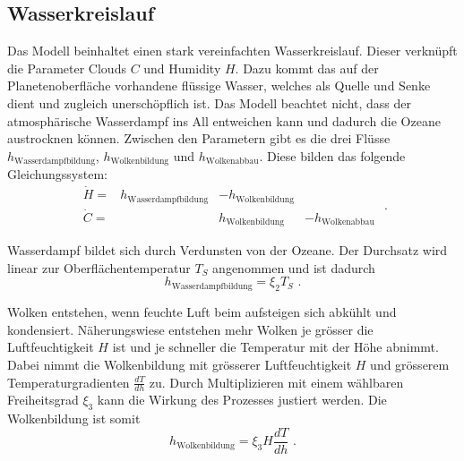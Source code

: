 \begin{refsection}
\subsection{Wasserkreislauf}
Das Modell beinhaltet einen stark vereinfachten Wasserkreislauf.
Dieser verknüpft die Parameter Clouds $C$ und Humidity $H$.
Dazu kommt das auf der Planetenoberfläche vorhandene flüssige Wasser, welches als Quelle und Senke dient und zugleich unerschöpflich ist. Das Modell beachtet nicht, dass der atmosphärische Wasserdampf ins All entweichen kann und dadurch die Ozeane austrocknen können. Zwischen den Parametern gibt es die drei Flüsse $h_{\text{Wasserdampfbildung}}$, $h_{\text{Wolkenbildung}}$ und $h_{\text{Wolkenabbau}}$. Diese bilden das folgende Gleichungssystem: 
\begin{equation}
\begin{matrix}
\dot{H}   = & h_{\text{Wasserdampfbildung}} & - h_{\text{Wolkenbildung}}   &                      \\
\dot{C}   = &                     		    &   h_{\text{Wolkenbildung}}   & - h_{\text{Wolkenabbau}}
\end{matrix} \text{ .}
\end{equation}

Wasserdampf bildet sich durch Verdunsten von der Ozeane. Der Durchsatz wird linear zur Oberflächentemperatur $T_S$ angenommen und ist dadurch
\begin{equation}
h_{\text{Wasserdampfbildung}} = \xi_2 T_S \text{ .}
\end{equation}

Wolken entstehen, wenn feuchte Luft beim aufsteigen sich abkühlt und kondensiert. Näherungswiese entstehen mehr Wolken je grösser die Luftfeuchtigkeit $H$ ist und je schneller die Temperatur mit der Höhe abnimmt.
Dabei nimmt die Wolkenbildung mit grösserer Luftfeuchtigkeit $H$ und grösserem Temperaturgradienten $\frac{dT}{dh}$ zu. Durch Multiplizieren mit einem wählbaren Freiheitsgrad $\xi_3$ kann die Wirkung des Prozesses justiert werden. Die Wolkenbildung ist somit
\begin{equation}
h_{\text{Wolkenbildung}} = \xi_3 H \frac{dT}{dh} \text{ .}
\end{equation}


\end{refsection}
